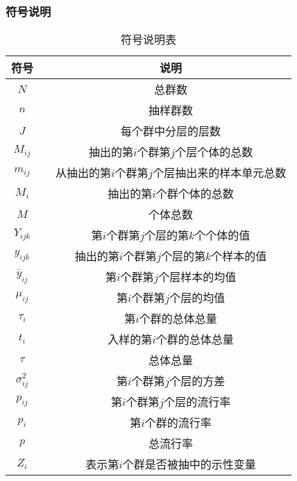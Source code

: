 \subsubsection{符号说明}
\begin{table}[H]
	\centering
	\setlength{\tabcolsep}{25pt} %
	\begin{tabular}{ccc}
		\toprule
		符号    &  & 说明 \\
		\midrule
		$N$ & & 总群数 \\
		$n$ & & 抽样群数 \\
		$J$ & & 每个群中分层的层数 \\
		$M_{ij}$ & & 抽出的第$i$个群第$j$个层个体的总数 \\
		$m_{ij}$ & & 从抽出的第$i$个群第$j$个层抽出来的样本单元总数 \\
		$M_{i}$ & & 抽出的第$i$个群个体的总数 \\
		$M$ & & 个体总数 \\
		$Y_{ijk}$ & &第$i$个群第$j$个层的第$k$个个体的值 \\
		$y_{ijk}$ & &抽出的第$i$个群第$j$个层的第$k$个样本的值 \\
		$\bar{y}_{ij}$ & & 第$i$个群第$j$个层样本的均值 \\
		$\mu_{ij}$ & & 第$i$个群第$j$个层的均值 \\
		$\tau_i$ & & 第$i$个群的总体总量 \\
		$t_i$ & & 入样的第$i$个群的总体总量 \\
		$\tau$ & & 总体总量 \\
		$\sigma_{ij}^2$ & & 第$i$个群第$j$个层的方差 \\
		$p_{ij}$ & & 第$i$个群第$j$个层的流行率 \\
		$p_i$ & & 第$i$个群的流行率 \\
		$p$ & & 总流行率 \\
		$Z_i$ & & 表示第$i$个群是否被抽中的示性变量 \\
		\bottomrule
	\end{tabular}
	\caption{符号说明表}
\end{table}

